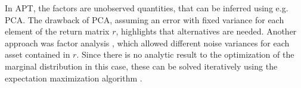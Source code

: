 In APT, the factors are unobserved quantities, that can be inferred using e.g. PCA. The drawback of PCA, assuming an error with fixed variance for each element of the return matrix $r$, highlights that alternatives are needed. Another approach was factor analysis \cite{Everitt_1984}, which allowed different noise variances for each asset contained in $r$. Since there is no analytic result to the optimization of the marginal distribution in this case, these can be solved iteratively using the expectation maximization algorithm \cite{Bishop_2006}. 
